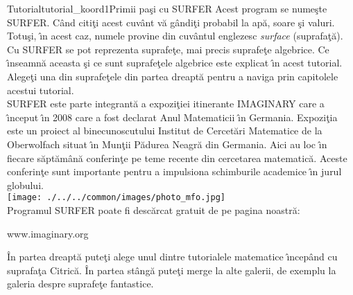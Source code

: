 \begin{surferIntroPage}{Tutorial}{tutorial_koord1}{Primii pa\c si cu SURFER}
Acest program se nume\c ste SURFER. C\^and citi\c ti acest cuv\^ant v\u a g\^andi\c ti probabil la ap\u a,
soare \c si valuri. Totu\c si, \^\i n acest caz, numele provine din cuv\^antul englezesc {\it surface} (suprafa\c t\u a).
\\
Cu SURFER se pot reprezenta suprafe\c te, mai precis suprafe\c te algebrice. Ce \^\i nseamn\u a aceasta
\c si ce sunt suprafe\c tele algebrice este explicat \^\i n acest tutorial. Alege\c ti una din suprafe\c tele din partea dreapt\u a pentru a naviga prin capitolele acestui tutorial.\\
SURFER este parte integrant\u a a expozi\c tiei itinerante IMAGINARY care a \^\i nceput \^\i n 2008 care a
fost declarat Anul Matematicii \^\i n Germania. Expozi\c tia este un proiect al binecunoscutului Institut
de Cercet\u ari Matematice de la Oberwolfach situat \^\i n Mun\c tii P\u adurea Neagr\u a din Germania. Aici au loc \^\i n fiecare s\u apt\u am\^an\u a conferin\c te pe teme recente din cercetarea matematic\u a. Aceste conferin\c te sunt importante pentru a impulsiona schimburile academice \^\i n jurul globului. \\
\vspace{0.2cm} \hspace{3.5cm}\texttt{[image: ./../../common/images/photo\_mfo.jpg]}\\
Programul SURFER poate fi desc\u arcat gratuit de pe pagina noastr\u a: \\
\begin{centering}
www.imaginary.org\\
\end{centering}
 \vspace{0.2cm}
\^In partea dreapt\u a pute\c ti alege unul dintre tutorialele matematice \^\i ncep\^and cu suprafa\c ta Citric\u a. \^In partea st\^ang\u a pute\c ti merge la alte galerii, de exemplu la galeria despre suprafe\c te fantastice.
\end{surferIntroPage}